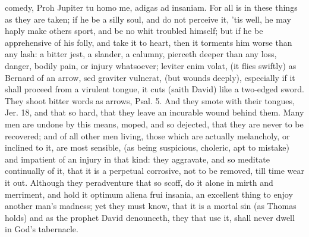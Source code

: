 {comedy, Proh Jupiter tu homo me, adigas ad insaniam. For all is in
these things as they are taken; if he be a silly soul, and do not
perceive it, 'tis well, he may haply make others sport, and be no whit
troubled himself; but if he be apprehensive of his folly, and take it
to heart, then it torments him worse than any lash: a bitter jest, a
slander, a calumny, pierceth deeper than any loss, danger, bodily pain,
or injury whatsoever; leviter enim volat, (it flies swiftly) as Bernard
of an arrow, sed graviter vulnerat, (but wounds deeply), especially if
it shall proceed from a virulent tongue, it cuts (saith David) like a
two-edged sword. They shoot bitter words as arrows, Psal.  5. And
they smote with their tongues, Jer.  18, and that so hard, that
they leave an incurable wound behind them. Many men are undone by this
means, moped, and so dejected, that they are never to be recovered; and
of all other men living, those which are actually melancholy, or
inclined to it, are most sensible, (as being suspicious, choleric, apt
to mistake) and impatient of an injury in that kind: they aggravate,
and so meditate continually of it, that it is a perpetual corrosive,
not to be removed, till time wear it out. Although they peradventure
that so scoff, do it alone in mirth and merriment, and hold it optimum
aliena frui insania, an excellent thing to enjoy another man's madness;
yet they must know, that it is a mortal sin (as Thomas holds) and
as the prophet David denounceth, they that use it, shall never
dwell in God's tabernacle.

}

